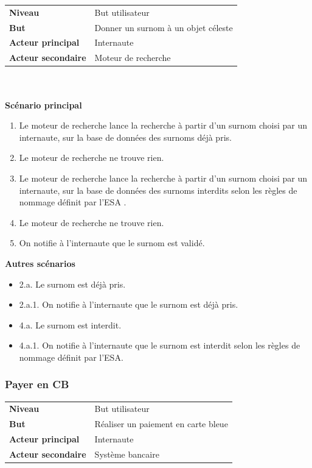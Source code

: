 \documentclass[11pt,a4paper]{article}
\begin{document}
\begin{tabular}{ll}
    \textbf{Niveau} & But utilisateur \\
    \textbf{But} & Donner un surnom à un objet céleste \\
    \textbf{Acteur principal} & Internaute \\
    \textbf{Acteur secondaire} & Moteur de recherche \newline
\end{tabular}
~\\
~\\

\textbf{Scénario principal}

\begin{enumerate}
    \item Le moteur de recherche lance la recherche à partir d’un surnom choisi par un internaute, sur la base de données des surnoms déjà pris.
    \item   Le moteur de recherche ne trouve rien.
    \item   Le moteur de recherche lance la recherche à partir d’un surnom choisi par un internaute, sur la base de données des surnoms interdits selon les règles de nommage définit par l’ESA .
    \item   Le moteur de recherche ne trouve rien.
    \item   On notifie à l’internaute que le surnom est validé.
\end{enumerate}

\textbf{Autres scénarios}

\begin{itemize}[label=]
    \item 2.a.  Le surnom est déjà pris.
    \item 2.a.1.    On notifie à l’internaute que le surnom est déjà pris.
    \item 4.a.  Le surnom est interdit.
    \item 4.a.1.    On notifie à l’internaute que le surnom est interdit selon les règles de nommage définit par l’ESA.
\end{itemize}


\subsubsection{Payer en CB}

\begin{tabular}{ll}
    \textbf{Niveau} & But utilisateur \\
    \textbf{But} & Réaliser un paiement en carte bleue \\
    \textbf{Acteur principal} & Internaute \\
    \textbf{Acteur secondaire} & Système bancaire \newline
\end{tabular}
~\\
~\\
\end{document}
